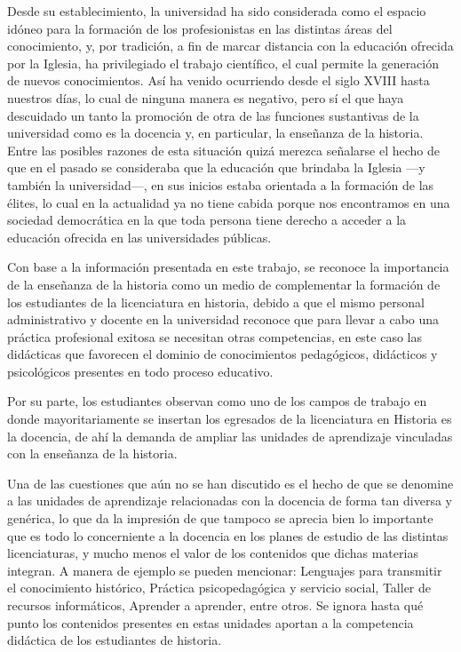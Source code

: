 Desde su establecimiento, la universidad ha sido considerada como el 
espacio idóneo para la formación de los profesionistas en las distintas 
áreas del conocimiento, y, por tradición,  a fin de marcar distancia 
con la educación ofrecida por la Iglesia, ha privilegiado el trabajo 
científico, el cual permite la generación de nuevos conocimientos. 
Así ha venido ocurriendo desde el siglo XVIII hasta nuestros días, 
lo cual de ninguna manera es negativo, pero sí el que haya descuidado 
un tanto la promoción de otra de las funciones sustantivas de la universidad 
como es la docencia y, en particular, la enseñanza de la historia. Entre las 
posibles razones de esta situación quizá merezca señalarse el hecho de 
que en el pasado se consideraba que la educación que brindaba la  
Iglesia ---y también  la universidad---, en sus inicios estaba orientada 
a la formación de las élites, lo cual en la actualidad ya no tiene 
cabida porque nos encontramos en una sociedad democrática en la que 
toda persona tiene derecho a acceder a la educación ofrecida en las 
universidades públicas. 

Con base a la información presentada en este trabajo, se reconoce la 
importancia de la enseñanza de la historia como un medio de 
complementar la formación de los estudiantes de la licenciatura en 
historia, debido a que el mismo personal administrativo y docente en la 
universidad reconoce que para llevar a cabo una práctica profesional 
exitosa se necesitan otras competencias, en este caso las didácticas que 
favorecen el dominio de conocimientos pedagógicos, didácticos y 
psicológicos presentes en todo proceso educativo. 

Por su parte, los estudiantes observan como uno de los campos de 
trabajo en donde mayoritariamente se insertan los egresados de la 
licenciatura en Historia es la docencia, de ahí la demanda de ampliar 
las unidades de aprendizaje vinculadas con la enseñanza de la historia. 

Una de las cuestiones que aún no se han discutido es el hecho de que 
se denomine a las unidades de aprendizaje relacionadas con la docencia 
de forma tan diversa y genérica, lo que da la impresión de 
que tampoco se aprecia bien lo importante que es todo lo 
concerniente a la docencia en los planes de estudio de las distintas licenciaturas, 
y mucho menos el valor de los contenidos que dichas materias integran. A manera de ejemplo 
se pueden mencionar: Lenguajes para transmitir el conocimiento histórico, 
Práctica psicopedagógica y servicio social, Taller de recursos informáticos, 
Aprender a aprender, entre otros. Se ignora hasta qué punto los contenidos 
presentes en estas unidades aportan a la competencia didáctica de los 
estudiantes de historia. 

